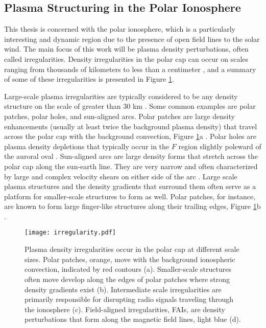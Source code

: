 \subsection{Plasma Structuring in the Polar Ionosphere}
\label{sec:polar_structure}

This thesis is concerned with the polar ionosphere, which is a particularly interesting and dynamic region due to the presence of open field lines to the solar wind.  The main focus of this work will be plasma density perturbations, often called irregularities.  Density irregularities in the polar cap can occur on scales ranging from thousands of kilometers to less than a centimeter \citep{Tsunoda1988}, and a summary of some of these irregularities is presented in Figure \ref{fig:polarirreg}.  

Large-scale plasma irregularities are typically considered to be any density structure on the scale of greater than 30 km \citep{Kelley2009}.  Some common examples are polar patches, polar holes, and sun-aligned arcs.  Polar patches are large density enhancements (usually at least twice the background plasma density) that travel across the polar cap with the background convection, Figure \ref{fig:polarirreg}a \citep{Weber1984,Valladares1994}.  Polar holes are plasma density depletions that typically occur in the \(F\) region slightly poleward of the auroral oval \citep{Benson2001}.  Sun-aligned arcs are large density forms that stretch across the polar cap along the sun-earth line.  They are very narrow and often characterized by large and complex velocity shears on either side of the arc \citep{Valladares1991}.  Large scale plasma structures and the density gradients that surround them often serve as a platform for smaller-scale structures to form as well.  Polar patches, for instance, are known to form large finger-like structures along their trailing edges, Figure \ref{fig:polarirreg}b \citep{Gondarenko2004b,Hosokawa2016}.

\begin{figure}
	\texttt{[image: irregularity.pdf]}
	\caption[Plasma irregularities in the polar ionosphere]{Plasma density irregularities occur in the polar cap at different scale sizes.  Polar patches, orange, move with the background ionospheric convection, indicated by red contours (a).  Smaller-scale structures often move develop along the edges of polar patches where strong density gradients exist (b).  Intermediate scale irregularities are primarily responsible for disrupting radio signals traveling through the ionosphere (c).  Field-aligned irregularities, FAIs, are density perturbations that form along the magnetic field lines, light blue (d).}
	\label{fig:polarirreg}
\end{figure}

